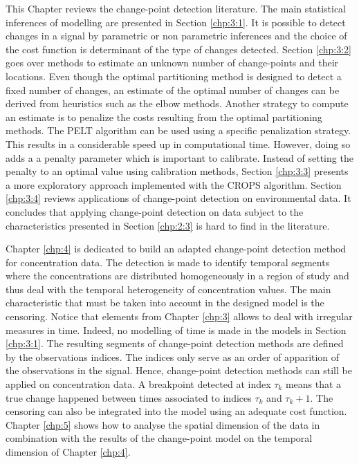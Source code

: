 This Chapter reviews the change-point detection literature. The main statistical inferences of modelling are presented in Section \ref{chp:3:1}. It is possible to detect changes in a signal by parametric or non parametric inferences and the choice of the cost function is determinant of the type of changes detected. Section \ref{chp:3:2} goes over methods to estimate an unknown number of change-points and their locations. Even though the optimal partitioning method is designed to detect a fixed number of changes, an estimate of the optimal number of changes can be derived from heuristics such as the elbow methods. Another strategy to compute an estimate is to penalize the costs resulting from the optimal partitioning methods. The PELT algorithm can be used using a specific penalization strategy. This results in a considerable speed up in computational time. However, doing so adds a a penalty parameter which is important to calibrate. Instead of setting the penalty to an optimal value using calibration methods, Section \ref{chp:3:3} presents a more exploratory approach implemented with the CROPS algorithm. Section \ref{chp:3:4} reviews applications of change-point detection on environmental data. It concludes that applying change-point detection on data subject to the characteristics presented in Section \ref{chp:2:3} is hard to find in the literature.  
 
Chapter \ref{chp:4} is dedicated to build an adapted change-point detection method for concentration data. The detection is made to identify temporal segments where the concentrations are distributed homogeneously in a region of study and thus deal with the temporal heterogeneity of concentration values. The main characteristic that must be taken into account in the designed model is the censoring. Notice that elements from Chapter \ref{chp:3} allows to deal with irregular measures in time. Indeed, no modelling of time is made in the models in Section \ref{chp:3:1}. The resulting segments of change-point detection methods are defined by the observations indices. The indices only serve as an order of apparition of the observations in the signal. Hence, change-point detection methods can still be applied on concentration data. A breakpoint detected at index $\tau_k$ means that a true change happened between times associated to indices $\tau_{k}$ and $\tau_{k}+1$. The censoring can also be integrated into the model using an adequate cost function. Chapter \ref{chp:5} shows how to analyse the spatial dimension of the data in combination with the results of the change-point model on the temporal dimension of Chapter \ref{chp:4}.        
